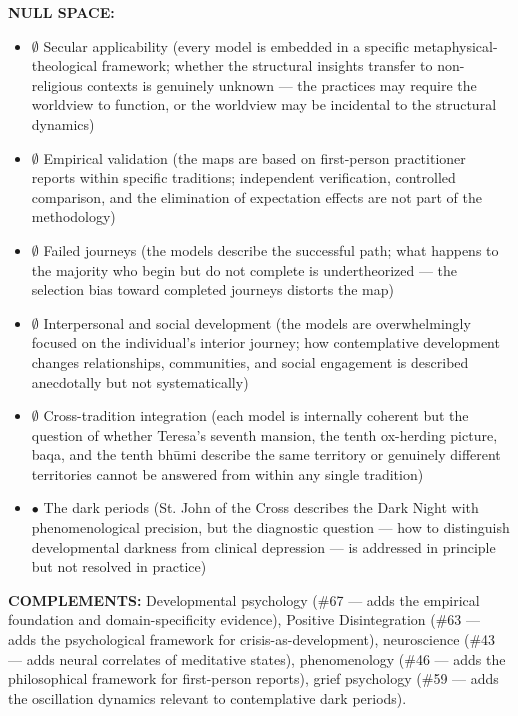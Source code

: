 \textbf{NULL SPACE:}

\begin{itemize}[nosep,leftmargin=*]
  \item $\emptyset$ Secular applicability (every model is embedded in a specific metaphysical-theological framework; whether the structural insights transfer to non-religious contexts is genuinely unknown — the practices may require the worldview to function, or the worldview may be incidental to the structural dynamics)
  \item $\emptyset$ Empirical validation (the maps are based on first-person practitioner reports within specific traditions; independent verification, controlled comparison, and the elimination of expectation effects are not part of the methodology)
  \item $\emptyset$ Failed journeys (the models describe the successful path; what happens to the majority who begin but do not complete is undertheorized — the selection bias toward completed journeys distorts the map)
  \item $\emptyset$ Interpersonal and social development (the models are overwhelmingly focused on the individual's interior journey; how contemplative development changes relationships, communities, and social engagement is described anecdotally but not systematically)
  \item $\emptyset$ Cross-tradition integration (each model is internally coherent but the question of whether Teresa's seventh mansion, the tenth ox-herding picture, baqa, and the tenth bhūmi describe the same territory or genuinely different territories cannot be answered from within any single tradition)
  \item $\bullet$ The dark periods (St. John of the Cross describes the Dark Night with phenomenological precision, but the diagnostic question — how to distinguish developmental darkness from clinical depression — is addressed in principle but not resolved in practice)
\end{itemize}


\textbf{COMPLEMENTS:} Developmental psychology (\#67 — adds the empirical foundation and domain-specificity evidence), Positive Disintegration (\#63 — adds the psychological framework for crisis-as-development), neuroscience (\#43 — adds neural correlates of meditative states), phenomenology (\#46 — adds the philosophical framework for first-person reports), grief psychology (\#59 — adds the oscillation dynamics relevant to contemplative dark periods).


